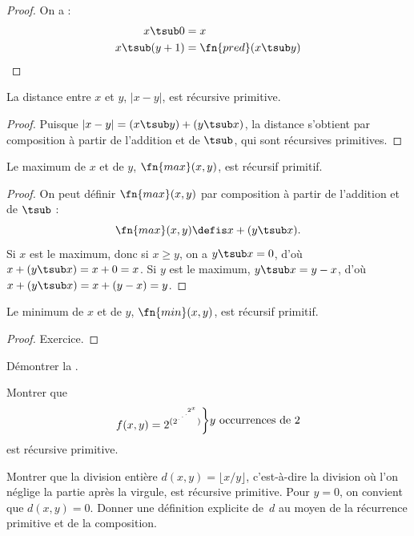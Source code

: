 \documentclass[../../../include/open-logic-section]{subfiles}
\begin{document}
\begin{proof}
  On a :
  \begin{align*}
    x \tsub 0 & = x\\
    x \tsub (y+1) & = \fn{pred}(x \tsub y)
  \end{align*}
\end{proof}

\begin{prop}
 La distance entre $x$ et $y$, $\left|x-y\right|$,
 est récursive primitive.
\end{prop}

\begin{proof}
  Puisque $\left|x-y\right|=(x\tsub y)+(y\tsub x)$,
  la distance s'obtient par composition à partir de
  l'addition et de $\tsub$, qui sont récursives primitives.
\end{proof}

\begin{prop}
  Le maximum de $x$ et de $y$, $\fn{max}(x,y)$,
  est récursif primitif.
\end{prop}

\begin{proof}
  On peut définir $\fn{max}(x,y)$ par composition
  à partir de l'addition et de $\tsub$ :
  \[
  \fn{max}(x,y) \defis x + (y \tsub x).
  \]
  Si $x$ est le maximum, donc si $x\ge y$, on a
  $y\tsub x=0$, d'où $x+(y\tsub x)=x+0=x$.
  Si $y$ est le maximum, $y\tsub x=y-x$,
  d'où $x+(y\tsub x)=x+(y-x)=y$.
\end{proof}

\begin{prop}
  Le minimum de $x$ et de $y$, $\fn{min}(x,y)$,
  est récursif primitif.
\end{prop}

\begin{proof}
  Exercice.
\end{proof}

\begin{prob}
  Démontrer la .
\end{prob}

\begin{prob}
Montrer que \[
f(x, y) =
2^{(2^{\iddots^{2^{x}}})}\raisebox{1ex}{\bigg\rbrace}
\raisebox{1ex}{\text {$y$ occurrences de $2$}}\]
est récursive primitive.
\end{prob}

\begin{prob}
Montrer que la division entière
$d(x,y)=\lfloor x/y\rfloor$, c'est-à-dire la division
où l'on néglige la partie après la virgule, est récursive
primitive. Pour $y=0$, on convient que $d(x,y)=0$.
Donner une définition explicite de~$d$ au moyen de
la récurrence primitive et de la composition.
\end{prob}
\end{document}
